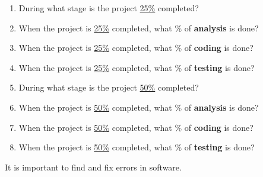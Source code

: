 \begin{enumerate}%

\item During what stage is the project \underline{25\%} completed?

\item When the project is \underline{25\%} completed, what \% of \textbf{analysis} is done?

\item When the project is \underline{25\%} completed, what \% of \textbf{coding} is done?

\item When the project is \underline{25\%} completed, what \% of \textbf{testing} is done?

\item During what stage is the project \underline{50\%} completed?

\item When the project is \underline{50\%} completed, what \% of \textbf{analysis} is done?

\item When the project is \underline{50\%} completed, what \% of \textbf{coding} is done?

\item When the project is \underline{50\%} completed, what \% of \textbf{testing} is done?

\end{enumerate}


\Q It is important to find and fix errors in software.

